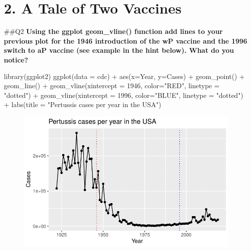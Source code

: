 \documentclass[
  letterpaper,
  DIV=11,
  numbers=noendperiod]{scrartcl}
\newenvironment{Shaded}{\begin{snugshade}}{\end{snugshade}}
\newcommand{\AttributeTok}[1]{\textcolor[rgb]{0.40,0.45,0.13}{#1}}
\newcommand{\DecValTok}[1]{\textcolor[rgb]{0.68,0.00,0.00}{#1}}
\newcommand{\FunctionTok}[1]{\textcolor[rgb]{0.28,0.35,0.67}{#1}}
\newcommand{\NormalTok}[1]{\textcolor[rgb]{0.00,0.23,0.31}{#1}}
\newcommand{\SpecialCharTok}[1]{\textcolor[rgb]{0.37,0.37,0.37}{#1}}
\newcommand{\StringTok}[1]{\textcolor[rgb]{0.13,0.47,0.30}{#1}}
\begin{document}
\hypertarget{a-tale-of-two-vaccines}{%
\section{2. A Tale of Two Vaccines}\label{a-tale-of-two-vaccines}}

\#\#Q2 \textbf{Using the ggplot geom\_vline() function add lines to your
previous plot for the 1946 introduction of the wP vaccine and the 1996
switch to aP vaccine (see example in the hint below). What do you
notice?}

\begin{Shaded}
\begin{Highlighting}[]
\FunctionTok{library}\NormalTok{(ggplot2)}
\FunctionTok{ggplot}\NormalTok{(}\AttributeTok{data =}\NormalTok{ cdc) }\SpecialCharTok{+} \FunctionTok{aes}\NormalTok{(}\AttributeTok{x=}\NormalTok{Year, }\AttributeTok{y=}\NormalTok{Cases) }\SpecialCharTok{+}
  \FunctionTok{geom\_point}\NormalTok{() }\SpecialCharTok{+}
  \FunctionTok{geom\_line}\NormalTok{() }\SpecialCharTok{+}
  \FunctionTok{geom\_vline}\NormalTok{(}\AttributeTok{xintercept =} \DecValTok{1946}\NormalTok{, }\AttributeTok{color=}\StringTok{"RED"}\NormalTok{, }\AttributeTok{linetype =} \StringTok{"dotted"}\NormalTok{) }\SpecialCharTok{+}
  \FunctionTok{geom\_vline}\NormalTok{(}\AttributeTok{xintercept =} \DecValTok{1996}\NormalTok{, }\AttributeTok{color=}\StringTok{"BLUE"}\NormalTok{, }\AttributeTok{linetype =} \StringTok{"dotted"}\NormalTok{) }\SpecialCharTok{+}
  \FunctionTok{labs}\NormalTok{(}\AttributeTok{title =} \StringTok{"Pertussis cases per year in the USA"}\NormalTok{)}
\end{Highlighting}
\end{Shaded}

\begin{figure}[H]

{\centering \includegraphics{Class19_files/figure-pdf/unnamed-chunk-3-1.pdf}

}

\end{figure}
\end{document}
